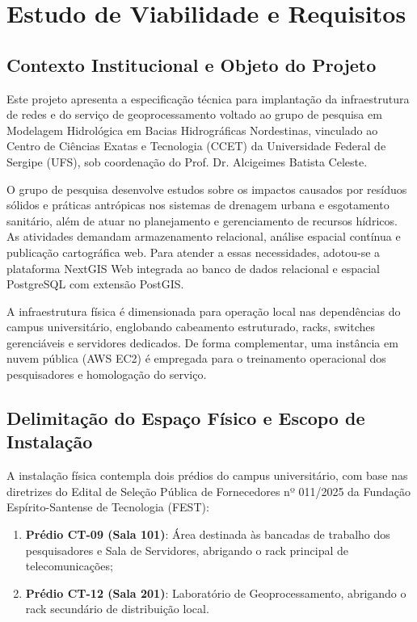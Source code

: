 
\chapter{Estudo de Viabilidade e Requisitos}
\label{cap:viabilidade_requisitos}

\section{Contexto Institucional e Objeto do Projeto}

Este projeto apresenta a especificação técnica para implantação da infraestrutura de redes e do serviço de geoprocessamento voltado ao grupo de pesquisa em Modelagem Hidrológica em Bacias Hidrográficas Nordestinas, vinculado ao Centro de Ciências Exatas e Tecnologia (CCET) da Universidade Federal de Sergipe (UFS), sob coordenação do Prof. Dr. Alcigeimes Batista Celeste.

O grupo de pesquisa desenvolve estudos sobre os impactos causados por resíduos sólidos e práticas antrópicas nos sistemas de drenagem urbana e esgotamento sanitário, além de atuar no planejamento e gerenciamento de recursos hídricos. As atividades demandam armazenamento relacional, análise espacial contínua e publicação cartográfica web. Para atender a essas necessidades, adotou-se a plataforma NextGIS Web integrada ao banco de dados relacional e espacial PostgreSQL com extensão PostGIS.

A infraestrutura física é dimensionada para operação local nas dependências do campus universitário, englobando cabeamento estruturado, racks, switches gerenciáveis e servidores dedicados. De forma complementar, uma instância em nuvem pública (AWS EC2) é empregada para o treinamento operacional dos pesquisadores e homologação do serviço.

\section{Delimitação do Espaço Físico e Escopo de Instalação}

A instalação física contempla dois prédios do campus universitário, com base nas diretrizes do Edital de Seleção Pública de Fornecedores nº 011/2025 da Fundação Espírito-Santense de Tecnologia (FEST):
\begin{enumerate}
    \item \textbf{Prédio CT-09 (Sala 101)}: Área destinada às bancadas de trabalho dos pesquisadores e Sala de Servidores, abrigando o rack principal de telecomunicações;
    \item \textbf{Prédio CT-12 (Sala 201)}: Laboratório de Geoprocessamento, abrigando o rack secundário de distribuição local.
\end{enumerate}

